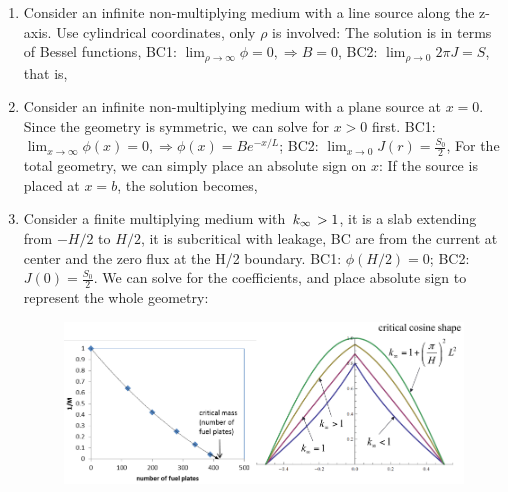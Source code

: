\documentclass{school-22.211-notes}
\begin{document}
\begin{enumerate}
\begin{enumerate}
  \item Consider an infinite non-multiplying medium with a line source along the z-axis. Use cylindrical coordinates, only $\rho$ is involved:
    The solution is in terms of Bessel functions, 
    BC1: $\lim_{\rho \to \infty} \phi = 0, \Rightarrow B = 0$, BC2: $\lim_{\rho \to 0} 2 \pi J = S$, that is, 


  \item Consider an infinite non-multiplying medium with a plane source at $x=0$. Since the geometry is symmetric, we can solve for $x>0$ first. 
    BC1: $\lim_{x \to \infty} \phi(x) = 0, \Rightarrow \phi(x) = B e^{-x/L}$; BC2: $\lim_{x\to 0} J(r)  = \frac{S_0}{2}$, 
    For the total geometry, we can simply place an absolute sign on $x$:
    If the source is placed at $x=b$, the solution becomes,

  \item Consider a finite multiplying medium with $\left. k_{\infty} \right. > 1$, it is a slab extending from $-H/2$ to $H/2$, it is subcritical with leakage, BC are from the current at center and the zero flux at the H/2 boundary. 
    BC1: $\phi(H/2) = 0$; BC2: $J(0) = \frac{S_0}{2}$. We can solve for the coefficients, and place absolute sign to represent the whole geometry: 
    \begin{figure}
      \centering
      \includegraphics[width=5in]{images/dfs/approach-critical.png}
    \end{figure}


\end{enumerate}
\end{enumerate}
\end{document}
